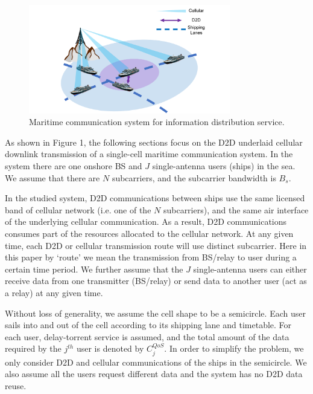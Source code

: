 \documentclass{ieeeaccess}
\begin{document}
\begin{figure} [htb]
\includegraphics*[width=8.8cm]{SysModel.png}
\caption{Maritime communication system for information distribution service.}\label{fig:1}
\end{figure}



As shown in Figure 1, the following sections focus on the D2D underlaid cellular downlink transmission of a single-cell maritime communication system. In the system there are one onshore BS
and  $J$ single-antenna users (ships) in the sea. We assume that there are $N$ subcarriers, and the subcarrier bandwidth is ${B_s}$. 

In the studied system, D2D communications between ships use the same licensed band of cellular network (i.e. one of the $N$ subcarriers), and the same air interface of the underlying cellular communication. As a result, D2D communications consumes part of the resources allocated to the cellular network.
At any given time, each D2D or cellular transmission route will use distinct subcarrier. Here in this paper by `route' we mean the transmission from BS/relay to user during a certain time period. We further assume that the $J$ single-antenna users can either receive data from one transmitter (BS/relay) or send data to another user (act as a relay) at any given time.

Without loss of generality, we assume the cell shape to be a semicircle. 
Each user sails into and out of the cell according to its shipping lane and timetable. For each user, delay-torrent service is assumed, and the total amount of the data required by the ${j^{th}}$ user is denoted by $C_j^{QoS}$. In order to simplify the problem, we only consider D2D and cellular communications of the ships in the semicircle. We also assume all the users request different data and the system has no D2D data reuse.
\end{document}

